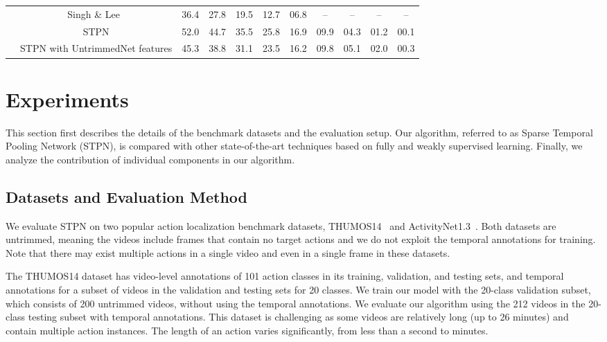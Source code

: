 \documentclass[10pt,twocolumn,letterpaper]{article}
\begin{document}
\begin{table*}[t]
{\begin{tabular}{c|c||ccccccccc}
& Singh \& Lee~\cite{singh17hide} & 36.4 & 27.8 & 19.5 & 12.7 & {\color{white}0}6.8 & -- & -- & -- & -- \\ \cline{2-11}
& STPN	   & 52.0 & 44.7 & 35.5 & 25.8 & 16.9 & {\color{white}0}9.9 & {\color{white}0}4.3 & {\color{white}0}1.2 & {\color{white}0}0.1 \\
& STPN with UntrimmedNet features & 45.3 & 38.8 & 31.1 & 23.5 & 16.2 & {\color{white}0}9.8 & {\color{white}0}5.1 & {\color{white}0}2.0 & {\color{white}0}0.3 \\
\hline
\end{tabular}}
\end{table*}


\section{Experiments}
\label{sec:experiment}

This section first describes the details of the benchmark datasets and the evaluation setup.
Our algorithm, referred to as Sparse Temporal Pooling Network (STPN), is compared with other state-of-the-art techniques based on fully and weakly supervised learning.
Finally, we analyze the contribution of individual components in our algorithm.




\subsection{Datasets and Evaluation Method}
\label{sub:datasets}
We evaluate STPN on two popular action localization benchmark datasets, THUMOS14~\cite{jiang14thumos} and ActivityNet1.3~\cite{heilbron15activitynet}.
Both datasets are untrimmed, meaning the videos include frames that contain no target actions and we do not exploit the temporal annotations for training.
Note that there may exist multiple actions in a single video and even in a single frame in these datasets.

The THUMOS14 dataset has video-level annotations of 101 action classes in its training, validation, and testing sets, and temporal annotations for a subset of videos in the validation and testing sets for 20 classes.
We train our model with the 20-class validation subset, which consists of 200 untrimmed videos, without using the temporal annotations.
We evaluate our algorithm using the 212 videos in the 20-class testing subset with temporal annotations.
This dataset is challenging as some videos are relatively long (up to 26 minutes) and contain multiple action instances.
The length of an action varies significantly, from less than a second to minutes.
\end{document}
